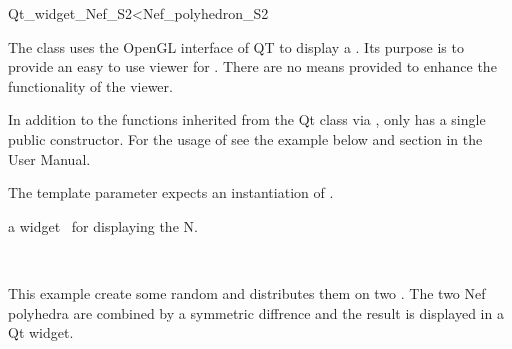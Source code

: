 
\ccRefPageBegin



\begin{ccRefClass}{Qt_widget_Nef_S2<Nef_polyhedron_S2}

\ccDefinition
 
The class  uses the OpenGL interface of QT to display a
. Its purpose is to provide an easy to use viewer for 
. There are no means provided to enhance the 
functionality of the viewer.

In addition to the functions inherited from the Qt class  via 
,  only has a single public 
constructor. For the usage of  see the example 
below and section  in the User Manual.


\ccParameters
The template parameter expects an instantiation of .
 
\ccInheritsFrom
{}

\ccCreation
{}

{a widget \ccVar\ for displaying the  N.}

\ccSeeAlso

\\

\ccExample
This example create some random  and distributes them on
two . The two Nef polyhedra are combined by a symmetric
diffrence and the result is displayed in a Qt widget.


\end{ccRefClass}

\ccRefPageEnd
